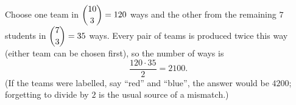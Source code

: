 Choose one team in $\dbinom{10}{3}=120$ ways and the other from the remaining $7$ students in $\dbinom73=35$ ways. Every pair of teams is produced twice this way (either team can be chosen first), so the number of ways is
\[\dfrac{120\cdot35}{2}=\boxed{2100}.\]
(If the teams were labelled, say ``red'' and ``blue'', the answer would be $4200$; forgetting to divide by $2$ is the usual source of a mismatch.)
